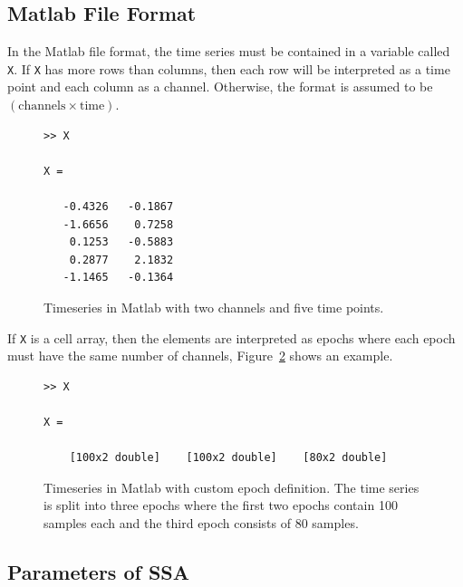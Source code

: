 \documentclass{article}
\newcommand{\1}{\ensuremath{\mathds{1}}}
\newcommand{\0}{\ensuremath{0}}
\begin{document}
\subsection{Matlab File Format}

In the Matlab file format, the time series must be contained in a variable
called \texttt{X}. If \texttt{X} has more rows than columns, then each row
will be interpreted as a time point and each column as a channel. Otherwise,
the format is assumed to be $(\text{channels} \times \text{time})$. 

\begin{figure}[h]
\centering
\begin{boxedminipage}{10cm}
\begin{verbatim}
>> X

X =

   -0.4326   -0.1867
   -1.6656    0.7258
    0.1253   -0.5883
    0.2877    2.1832
   -1.1465   -0.1364

\end{verbatim}
\end{boxedminipage}
\caption{Timeseries in Matlab with two channels and five time points.
\label{fig:ex_matlabts}
}
\end{figure}

If \texttt{X} is a cell array, then the elements
are interpreted as epochs where each epoch must have the same number 
of channels, Figure~\ref{fig:ex_matlabsegs} shows
an example.

\begin{figure}[h]
\centering
\begin{boxedminipage}{10cm}
\begin{verbatim}
>> X

X = 

    [100x2 double]    [100x2 double]    [80x2 double]
\end{verbatim}
\end{boxedminipage}
\caption{Timeseries in Matlab with custom epoch definition. The time series is split
into three epochs where the first two epochs contain 100 samples each and the third
epoch consists of 80 samples.
\label{fig:ex_matlabsegs}
}
\end{figure}

\FloatBarrier

\subsection{Parameters of SSA}
\label{sec:params}
\end{document}
